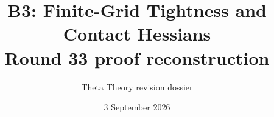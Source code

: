 \documentclass[11pt]{article}
\title{B3: Finite-Grid Tightness and Contact Hessians\\\large Round 33 proof reconstruction}
\author{Theta Theory revision dossier}
\date{3 September 2026}
\begin{document}
\maketitle
\reviewnote

\end{document}
